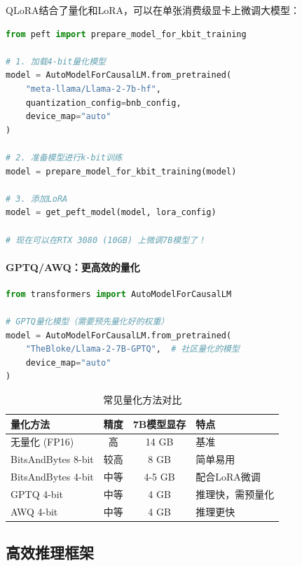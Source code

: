QLoRA结合了量化和LoRA，可以在单张消费级显卡上微调大模型：

\begin{lstlisting}[language=Python, caption=QLoRA微调]
from peft import prepare_model_for_kbit_training

# 1. 加载4-bit量化模型
model = AutoModelForCausalLM.from_pretrained(
    "meta-llama/Llama-2-7b-hf",
    quantization_config=bnb_config,
    device_map="auto"
)

# 2. 准备模型进行k-bit训练
model = prepare_model_for_kbit_training(model)

# 3. 添加LoRA
model = get_peft_model(model, lora_config)

# 现在可以在RTX 3080 (10GB) 上微调7B模型了！
\end{lstlisting}

\paragraph{GPTQ/AWQ：更高效的量化}\mbox{}\par\nopagebreak

\begin{lstlisting}[language=Python, caption=加载GPTQ量化模型]
from transformers import AutoModelForCausalLM

# GPTQ量化模型（需要预先量化好的权重）
model = AutoModelForCausalLM.from_pretrained(
    "TheBloke/Llama-2-7B-GPTQ",  # 社区量化的模型
    device_map="auto"
)
\end{lstlisting}

\begin{table}[htbp]
\centering
\small
\renewcommand{\arraystretch}{1.3}
\begin{tabular}{l|c|c|l}
\toprule
\textbf{量化方法} & \textbf{精度} & \textbf{7B模型显存} & \textbf{特点} \\
\midrule
无量化 (FP16) & 高 & 14 GB & 基准 \\
BitsAndBytes 8-bit & 较高 & 8 GB & 简单易用 \\
BitsAndBytes 4-bit & 中等 & 4-5 GB & 配合LoRA微调 \\
GPTQ 4-bit & 中等 & 4 GB & 推理快，需预量化 \\
AWQ 4-bit & 中等 & 4 GB & 推理更快 \\
\bottomrule
\end{tabular}
\caption{常见量化方法对比}
\end{table}

\subsection*{高效推理框架}

